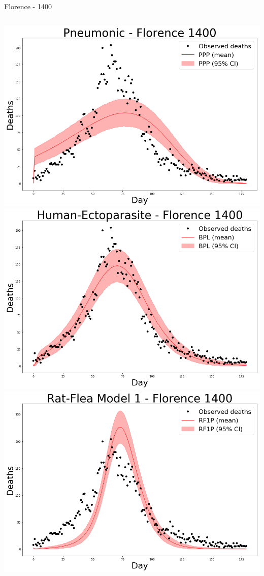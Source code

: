 \documentclass[t,10pt,fleqn]{beamer}
\begin{document}
\begin{frame}{Florence - 1400}
	\vspace{-.2cm}
	\begin{columns}
		\centering
		\includegraphics[width=\linewidth]{pneum/florence-40-30-22-15x10}
		\includegraphics[width=\linewidth]{h_ecto/florence-40-30-22-15x10}
		\centering
		\includegraphics[width=\linewidth]{rats1/florence-40-30-22-15x10}

\end{columns}
\end{frame}
\end{document}
